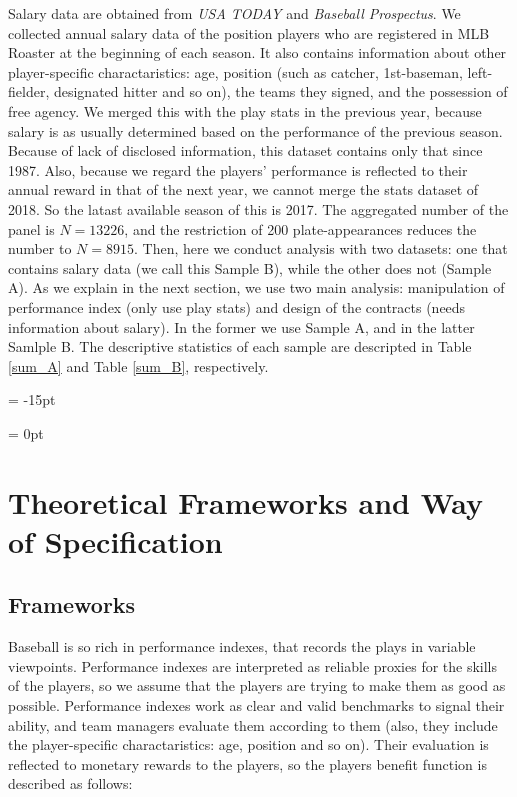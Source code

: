 \documentclass[dvipdfmx, 12pt]{article}
\begin{document}
Salary data are obtained from \textit{USA TODAY} and \textit{Baseball Prospectus}. We collected annual salary data of the position players who are registered in MLB Roaster at the beginning of each season. It also contains information about other player-specific charactaristics: age, position (such as catcher, 1st-baseman, left-fielder, designated hitter and so on), the teams they signed, and the possession of free agency. We merged this with the play stats in the previous year, because salary is as usually determined based on the performance of the previous season. Because of lack of disclosed information, this dataset contains only that since 1987. Also, because we regard the players' performance is reflected to their annual reward in that of the next year, we cannot merge the stats dataset of 2018. So the latast available season of this is 2017. The aggregated number of the panel is $N=13226$, and the restriction of 200 plate-appearances reduces the number to $N=8915$. Then, here we conduct analysis with two datasets: one that contains salary data (we call this Sample B), while the other does not (Sample A). As we explain in the next section, we use two main analysis: manipulation of performance index (only use play stats) and design of the contracts (needs information about salary). In the former we use Sample A, and in the latter Samlple B. The descriptive statistics of each sample are descripted in Table \ref{sum_A} and Table \ref{sum_B}, respectively.

\begin{table}
  
\end{table}

\leftskip = -15pt
\begin{table}
  
\end{table}
\leftskip = 0pt

\section{Theoretical Frameworks and Way of Specification}

\subsection{Frameworks}

Baseball is so rich in performance indexes, that records the plays in variable viewpoints. Performance indexes are interpreted as reliable proxies for the skills of the players, so we assume that the players are trying to make them as good as possible. Performance indexes work as clear and valid benchmarks to signal their ability, and team managers evaluate them according to them (also, they include the player-specific charactaristics: age, position and so on). Their evaluation is reflected to monetary rewards to the players, so the players benefit function is described as follows:
\end{document}
